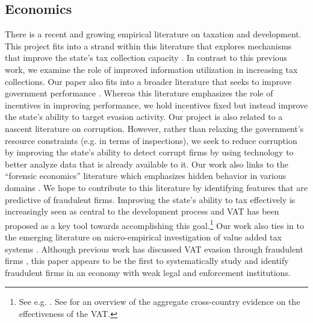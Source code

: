 \subsection{Economics}
\label{subsec:literature-economics}
There is a recent and growing empirical literature on taxation and development. This project fits into a strand within this literature
that explores mechanisms that improve the state's tax collection capacity \cite{khan2016tax}. In contrast to this previous work, we
examine the role of improved information utilization in increasing tax collections. Our paper also fits into a broader literature that seeks to improve government performance \cite{muralidharan2011teacher, glewwe2010teacher}. Whereas this literature emphasizes the role of incentives in improving performance, we hold incentives fixed but instead improve the state's ability to target evasion activity. Our project is also related to a nascent literature on corruption\cite{olken2012corruption, duflo2013truth}. However, rather than relaxing the government's resource constraints (e.g. in terms of inspections), we seek to reduce corruption by improving the state's ability to detect corrupt firms by using technology to better analyze data that is already available to it. Our work also links to the ``forensic economics'' literature which emphasizes hidden behavior in various domains \cite{zitzewitz2012forensic, jacob2003rotten, mironov2014corruption}. We hope to contribute to this literature by identifying features that are predictive of fraudulent firms. Improving the state's ability to tax effectively is increasingly seen as central to the development process and VAT has been proposed as a key tool towards accomplishing this goal.\footnote{See e.g. \cite{besley2013taxation}. See  \cite{Ebrilletal:2001} for an overview of the aggregate cross-country evidence on the effectiveness of the VAT.} Our work also ties in to the emerging literature on micro-empirical investigation of value added tax systems \cite{almunia2018under, mittal2017vat, naritomi2013consumers, pomeranz2015no}.  Although previous work has discussed VAT evasion through fraudulent firms \cite{keen2006vat, pashev2007countering}, this paper appears to be the first to systematically study and identify fraudulent firms in an economy with weak legal and enforcement institutions.

